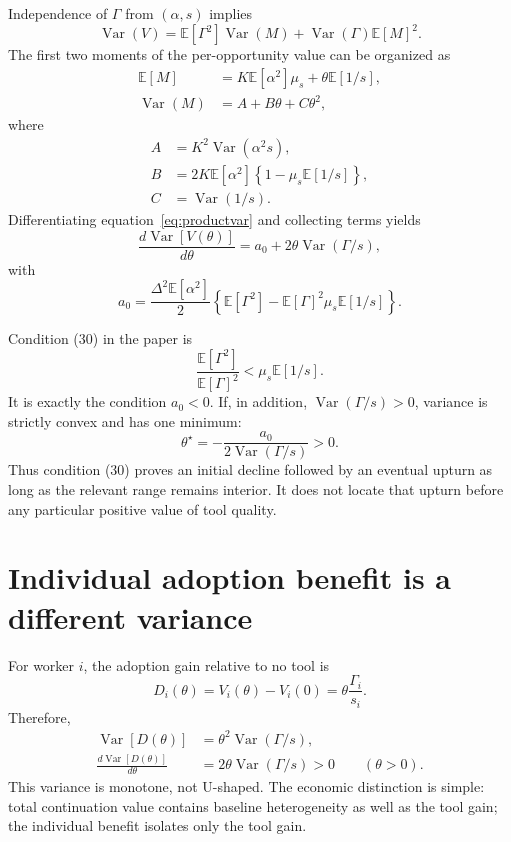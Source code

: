 \documentclass[11pt]{article}
\newcommand{\E}{\mathbb{E}}
\newcommand{\Var}{\operatorname{Var}}
\begin{document}
Independence of $\Gamma$ from $(\alpha,s)$ implies
\begin{equation}
  \Var(V)
  =\E[\Gamma^2]\Var(M)+\Var(\Gamma)\E[M]^2.
  \label{eq:productvar}
\end{equation}
The first two moments of the per-opportunity value can be organized as
\begin{align}
  \E[M]&=K\E[\alpha^2]\mu_s+\theta\E[1/s],\\
  \Var(M)&=A+B\theta+C\theta^2,
\end{align}
where
\begin{align}
  A&=K^2\Var(\alpha^2s),\\
  B&=2K\E[\alpha^2]\left\{1-\mu_s\E[1/s]\right\},\\
  C&=\Var(1/s).
\end{align}
Differentiating equation~\eqref{eq:productvar} and collecting terms yields
\begin{equation}
  \frac{d\Var[V(\theta)]}{d\theta}
  =a_0+2\theta\Var(\Gamma/s),
  \label{eq:slope}
\end{equation}
with
\begin{equation}
  a_0=\frac{\Delta^2\E[\alpha^2]}{2}
  \left\{\E[\Gamma^2]
  -\E[\Gamma]^2\mu_s\E[1/s]\right\}.
  \label{eq:a0}
\end{equation}

Condition (30) in the paper is
\begin{equation}
  \frac{\E[\Gamma^2]}{\E[\Gamma]^2}
  <\mu_s\E[1/s].
  \label{eq:condition30}
\end{equation}
It is exactly the condition $a_0<0$. If, in addition,
$\Var(\Gamma/s)>0$, variance is strictly convex and has one minimum:
\begin{equation}
  \theta^\star
  =-\frac{a_0}{2\Var(\Gamma/s)}>0.
  \label{eq:turning}
\end{equation}
Thus condition (30) proves an initial decline followed by an eventual upturn
as long as the relevant range remains interior. It does not locate that
upturn before any particular positive value of tool quality.

\section{Individual adoption benefit is a different variance}

For worker $i$, the adoption gain relative to no tool is
\begin{equation}
  D_i(\theta)
  =V_i(\theta)-V_i(0)
  =\theta\frac{\Gamma_i}{s_i}.
\end{equation}
Therefore,
\begin{align}
  \Var[D(\theta)]&=\theta^2\Var(\Gamma/s),\\
  \frac{d\Var[D(\theta)]}{d\theta}
    &=2\theta\Var(\Gamma/s)>0
    \qquad (\theta>0).
\end{align}
This variance is monotone, not U-shaped. The economic distinction is simple:
total continuation value contains baseline heterogeneity as well as the tool
gain; the individual benefit isolates only the tool gain.
\end{document}
